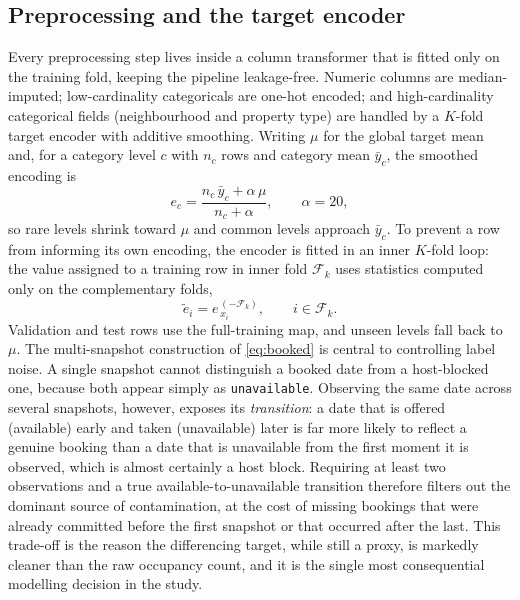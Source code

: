 \documentclass[review,12pt]{elsarticle}
\begin{document}
\subsection{Preprocessing and the target encoder}
Every preprocessing step lives inside a column transformer that is fitted only on
the training fold, keeping the pipeline leakage-free. Numeric columns are
median-imputed; low-cardinality categoricals are one-hot encoded; and
high-cardinality categorical fields (neighbourhood and property type) are handled
by a $K$-fold target encoder with additive smoothing. Writing $\mu$ for the global target mean and,
for a category level $c$ with $n_c$ rows and category mean $\bar y_c$, the
smoothed encoding is
\begin{equation}
e_c=\frac{n_c\,\bar y_c+\alpha\,\mu}{n_c+\alpha},\qquad \alpha=20,
\label{eq:te}
\end{equation}
so rare levels shrink toward $\mu$ and common levels approach $\bar y_c$. To
prevent a row from informing its own encoding, the encoder is fitted in an inner
$K$-fold loop: the value assigned to a training row in inner fold $\mathcal F_k$
uses statistics computed only on the complementary folds,
\begin{equation}
\tilde e_i=e^{\,(-\mathcal F_k)}_{\,x_i},\qquad i\in\mathcal F_k.
\label{eq:tekfold}
\end{equation}
Validation and test rows use the full-training map, and unseen levels fall back to
$\mu$. The multi-snapshot construction of \eqref{eq:booked} is central to
controlling label noise. A single snapshot cannot distinguish a booked date from a
host-blocked one, because both appear simply as \texttt{unavailable}. Observing the
same date across several snapshots, however, exposes its \emph{transition}: a date
that is offered (available) early and taken (unavailable) later is far more likely
to reflect a genuine booking than a date that is unavailable from the first moment
it is observed, which is almost certainly a host block. Requiring at least two
observations and a true available-to-unavailable transition therefore filters out
the dominant source of contamination, at the cost of missing bookings that were
already committed before the first snapshot or that occurred after the last. This
trade-off is the reason the differencing target, while still a proxy, is markedly
cleaner than the raw occupancy count, and it is the single most consequential
modelling decision in the study.
\end{document}
